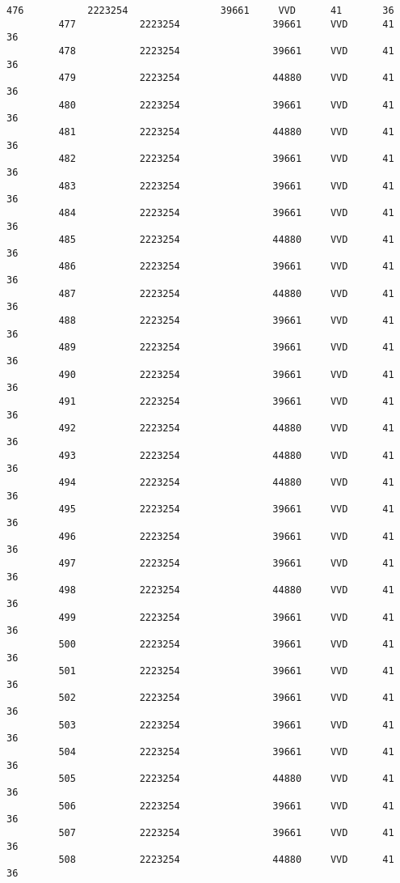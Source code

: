 \documentclass{article}
\begin{document}
\begin{Verbatim}[commandchars=\\\{\}]
         476           2223254                39661     VVD      41       36   
         477           2223254                39661     VVD      41       36   
         478           2223254                39661     VVD      41       36   
         479           2223254                44880     VVD      41       36   
         480           2223254                39661     VVD      41       36   
         481           2223254                44880     VVD      41       36   
         482           2223254                39661     VVD      41       36   
         483           2223254                39661     VVD      41       36   
         484           2223254                39661     VVD      41       36   
         485           2223254                44880     VVD      41       36   
         486           2223254                39661     VVD      41       36   
         487           2223254                44880     VVD      41       36   
         488           2223254                39661     VVD      41       36   
         489           2223254                39661     VVD      41       36   
         490           2223254                39661     VVD      41       36   
         491           2223254                39661     VVD      41       36   
         492           2223254                44880     VVD      41       36   
         493           2223254                44880     VVD      41       36   
         494           2223254                44880     VVD      41       36   
         495           2223254                39661     VVD      41       36   
         496           2223254                39661     VVD      41       36   
         497           2223254                39661     VVD      41       36   
         498           2223254                44880     VVD      41       36   
         499           2223254                39661     VVD      41       36   
         500           2223254                39661     VVD      41       36   
         501           2223254                39661     VVD      41       36   
         502           2223254                39661     VVD      41       36   
         503           2223254                39661     VVD      41       36   
         504           2223254                39661     VVD      41       36   
         505           2223254                44880     VVD      41       36   
         506           2223254                39661     VVD      41       36   
         507           2223254                39661     VVD      41       36   
         508           2223254                44880     VVD      41       36   

\end{Verbatim}
\end{document}

